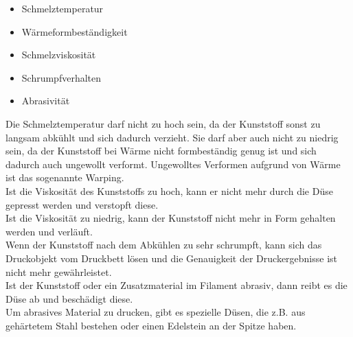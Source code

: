 \documentclass[10pt]{article}
\begin{document}
    \begin{itemize}
        \item Schmelztemperatur
        \item Wärmeformbeständigkeit
        \item Schmelzviskosität
        \item Schrumpfverhalten
        \item Abrasivität
    \end{itemize}
    Die Schmelztemperatur darf nicht zu hoch sein, da der Kunststoff sonst zu langsam abkühlt und sich dadurch verzieht.
    Sie darf aber auch nicht zu niedrig sein, da der Kunststoff bei Wärme nicht formbeständig genug ist und sich dadurch auch ungewollt verformt.
    Ungewolltes Verformen aufgrund von Wärme ist das sogenannte Warping. \\
    Ist die Viskosität des Kunststoffs zu hoch, kann er nicht mehr durch die Düse gepresst werden und verstopft diese. \\
    Ist die Viskosität zu niedrig, kann der Kunststoff nicht mehr in Form gehalten werden und verläuft. \\
    Wenn der Kunststoff nach dem Abkühlen zu sehr schrumpft, kann sich das Druckobjekt vom Druckbett lösen und die Genauigkeit der Druckergebnisse ist nicht mehr gewährleistet. \\
    Ist der Kunststoff oder ein Zusatzmaterial im Filament abrasiv, dann reibt es die Düse ab und beschädigt diese. \\
    Um abrasives Material zu drucken, gibt es spezielle Düsen, die z.B. aus gehärtetem Stahl bestehen oder einen Edelstein an der Spitze haben. \\

    \begin{figure}[H]
        \centering
        \qquad
    \end{figure}
\end{document}
